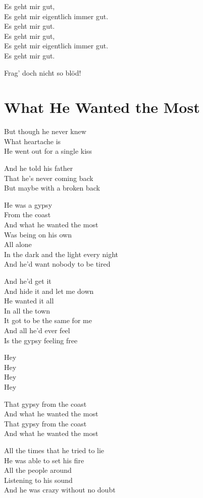 \documentclass[]{book}
\begin{document}
Es geht mir gut,\\
Es geht mir eigentlich immer gut.\\
Es geht mir gut.\\
Es geht mir gut,\\
Es geht mir eigentlich immer gut.\\
Es geht mir gut.

Frag' doch nicht so blöd!

\hypertarget{what-he-wanted-the-most}{%
\section{What He Wanted the Most}\label{what-he-wanted-the-most}}

But though he never knew\\
What heartache is\\
He went out for a single kiss

And he told his father\\
That he's never coming back\\
But maybe with a broken back

He was a gypsy\\
From the coast\\
And what he wanted the most\\
Was being on his own\\
All alone\\
In the dark and the light every night\\
And he'd want nobody to be tired

And he'd get it\\
And hide it and let me down\\
He wanted it all\\
In all the town\\
It got to be the same for me\\
And all he'd ever feel\\
Is the gypsy feeling free

Hey\\
Hey\\
Hey\\
Hey

That gypsy from the coast\\
And what he wanted the most\\
That gypsy from the coast\\
And what he wanted the most

All the times that he tried to lie\\
He was able to set his fire\\
All the people around\\
Listening to his sound\\
And he was crazy without no doubt
\end{document}
